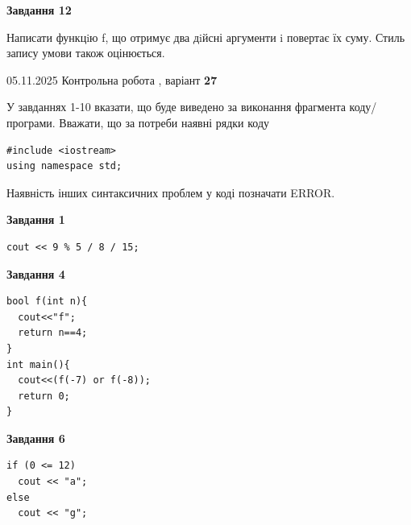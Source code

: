 \documentclass[12pt, ukrainian]{article}
\begin{document}
{\begin {large}
\begin{minipage}[t]{11.0cm}
\begin{center}
\textbf{Завдання 12}
\end{center}

Написати функцiю f, що отримує два дiйсні аргументи i повертає їх суму. Стиль запису умови також оцінюється.\par

\end{minipage}

\end {large}}
\newpage

{\Large{05.11.2025 Контрольна робота , варіант  \No \textbf { 27 }\par}}
{
\begin {large}
У завданнях 1-10 вказати, що буде виведено за виконання фрагмента коду/про\-гра\-ми.
Вважати, що за потреби наявні рядки коду
\begin{verbatim}
#include <iostream>
using namespace std;
\end{verbatim}
Наявність інших синтаксичних проблем у коді позначати ERROR.

\begin{minipage}[t]{7.0cm}

\begin{center}
\textbf{Завдання 1}
\end{center}
\vspace{-8mm}

\begin{verbatim}
cout << 9 % 5 / 8 / 15;
\end{verbatim}



\begin{center}
\textbf{Завдання 4}
\end{center}
\vspace{-8mm}

\begin{verbatim}
bool f(int n){
  cout<<"f";
  return n==4;
}
int main(){
  cout<<(f(-7) or f(-8));
  return 0;
}
\end{verbatim}



\begin{center}
\textbf{Завдання 6}
\end{center}
\vspace{-8mm}

\begin{verbatim}
if (0 <= 12)
  cout << "a";
else
  cout << "g";
\end{verbatim}




\end{minipage}
\end{large}}
\end{document}
